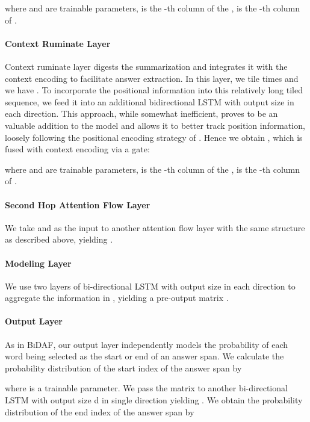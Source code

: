 \documentclass[11pt,letterpaper]{article}
\begin{document}
where  and  are trainable parameters, is the -th column of the ,  is the -th column of .

\paragraph{Context Ruminate Layer} Context ruminate layer digests the summarization and integrates it with the context encoding  to facilitate answer extraction. In this layer, we tile   times and we have . To incorporate the positional information into this relatively long tiled sequence, we feed it into an additional bidirectional LSTM with output size   in each direction. This approach, while somewhat inefficient, proves to be an valuable addition to the model and allows it to better track position information, loosely following the positional encoding strategy of \citet{memN2N_Sukhbaatar:2015ww}. Hence we obtain , which is fused with context encoding  via a gate:



where  and  are trainable parameters, is the -th column of the ,  is the -th column of .

\paragraph{Second Hop Attention Flow Layer} We take  and  as the input to another attention flow layer with the same structure as described above, yielding . 

\paragraph{Modeling Layer} We use two layers of bi-directional LSTM with output size  in each direction to aggregate the information in , yielding a pre-output matrix . 

\paragraph{Output Layer} As in \textsc{BiDAF}, our output layer independently models the probability of each word being selected as the start or end of an answer span. We calculate the probability distribution of the start index of the answer span by 

where  is a trainable parameter. We pass the matrix  to another bi-directional LSTM with output size d in single direction yielding . We obtain the probability distribution of the end index of the answer span by
\end{document}
